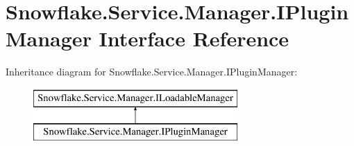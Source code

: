 \hypertarget{interface_snowflake_1_1_service_1_1_manager_1_1_i_plugin_manager}{}\section{Snowflake.\+Service.\+Manager.\+I\+Plugin\+Manager Interface Reference}
\label{interface_snowflake_1_1_service_1_1_manager_1_1_i_plugin_manager}
Inheritance diagram for Snowflake.\+Service.\+Manager.\+I\+Plugin\+Manager\+:\begin{figure}[H]
\begin{center}
\leavevmode
\includegraphics[height=2.000000cm]{interface_snowflake_1_1_service_1_1_manager_1_1_i_plugin_manager}
\end{center}
\end{figure}
